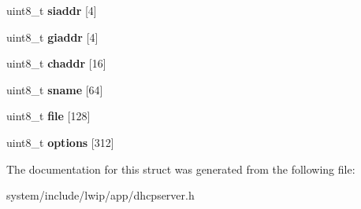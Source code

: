 \begin{DoxyCompactItemize}
\item 
\hypertarget{structdhcps__msg_af7beef08ac8c5e7e0fad0be480d03663}{}uint8\+\_\+t {\bfseries siaddr} \mbox{[}4\mbox{]}\label{structdhcps__msg_af7beef08ac8c5e7e0fad0be480d03663}

\item 
\hypertarget{structdhcps__msg_ab151af5816632c4e4784224c7d92f8b8}{}uint8\+\_\+t {\bfseries giaddr} \mbox{[}4\mbox{]}\label{structdhcps__msg_ab151af5816632c4e4784224c7d92f8b8}

\item 
\hypertarget{structdhcps__msg_aa972ae11efcd0dd4b26df3b9998626ca}{}uint8\+\_\+t {\bfseries chaddr} \mbox{[}16\mbox{]}\label{structdhcps__msg_aa972ae11efcd0dd4b26df3b9998626ca}

\item 
\hypertarget{structdhcps__msg_a37c6d315b6994f09c83d322d88a3585a}{}uint8\+\_\+t {\bfseries sname} \mbox{[}64\mbox{]}\label{structdhcps__msg_a37c6d315b6994f09c83d322d88a3585a}

\item 
\hypertarget{structdhcps__msg_a7006a9f5d8833d1baccd1075b6633cce}{}uint8\+\_\+t {\bfseries file} \mbox{[}128\mbox{]}\label{structdhcps__msg_a7006a9f5d8833d1baccd1075b6633cce}

\item 
\hypertarget{structdhcps__msg_abe3aae356c401b4ff83d402309564ae4}{}uint8\+\_\+t {\bfseries options} \mbox{[}312\mbox{]}\label{structdhcps__msg_abe3aae356c401b4ff83d402309564ae4}

\end{DoxyCompactItemize}


The documentation for this struct was generated from the following file\+:\begin{DoxyCompactItemize}
\item 
system/include/lwip/app/dhcpserver.\+h\end{DoxyCompactItemize}
